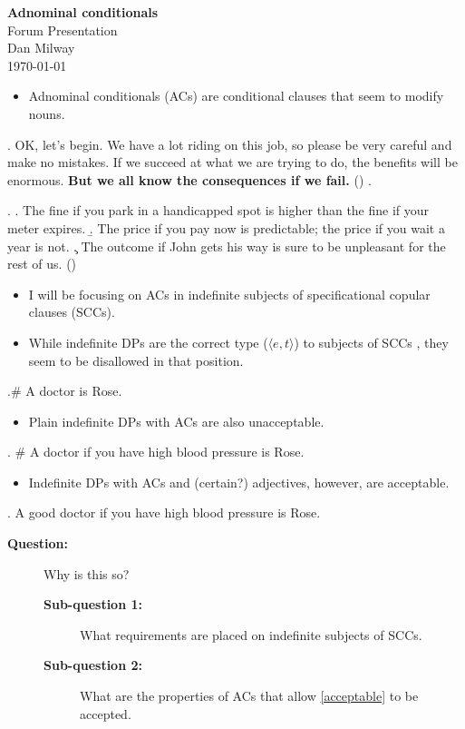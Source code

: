 \documentclass[letterpaper,12pt]{article}
\begin{document}
\begin{center}
	\textbf{Adnominal conditionals}\\
	Forum Presentation\\
	Dan Milway \\
	\today\\
\end{center}

\begin{itemize}
  \item Adnominal conditionals (ACs) are conditional clauses that seem to modify nouns.
\end{itemize}
\ex. OK, let's begin.
We have a lot riding on this job, so please be very careful and make no mistakes.
If we succeed at what we are trying to do, the benefits will be enormous.
\textbf{But we all know the consequences if we fail.} \hfill (\cite{lasersohn1996adnominal})
\z.

\ex.
\a. The fine if you park in a handicapped spot is higher than the fine if your
meter expires.
\b. The price if you pay now is predictable; the price if you wait a year is not.
\c. The outcome if John gets his way is sure to be unpleasant for the rest of
us. \hfill (\cite{lasersohn1996adnominal})

\begin{itemize}
	\item I will be focusing on ACs in indefinite subjects of specificational copular clauses (SCCs).
	\item While indefinite DPs are the correct type ($\langle e,t\rangle$) to subjects of SCCs \parencite{mikkelsen2004specifying}, they seem to be disallowed in that position.
\end{itemize}
\ex.\# A doctor is Rose.

\begin{itemize}
	\item Plain indefinite DPs with ACs are also unacceptable.
\end{itemize}
\ex.\label{ac-unacceptable} \# A doctor if you have high blood pressure is Rose.

\begin{itemize}
	\item Indefinite DPs with ACs and (certain?) adjectives, however, are acceptable.
\end{itemize}
\ex.\label{acceptable} A good doctor if you have high blood pressure is Rose.

\begin{description}
	\item[\textbf{Question:}] Why is this so?
		\begin{description}
			\item[\textbf{Sub-question 1:}] What requirements are placed on indefinite subjects of SCCs.
			\item[\textbf{Sub-question 2:}] What are the properties of ACs that allow \ref{acceptable} to be accepted.
		\end{description}
\end{description}
\end{document}
